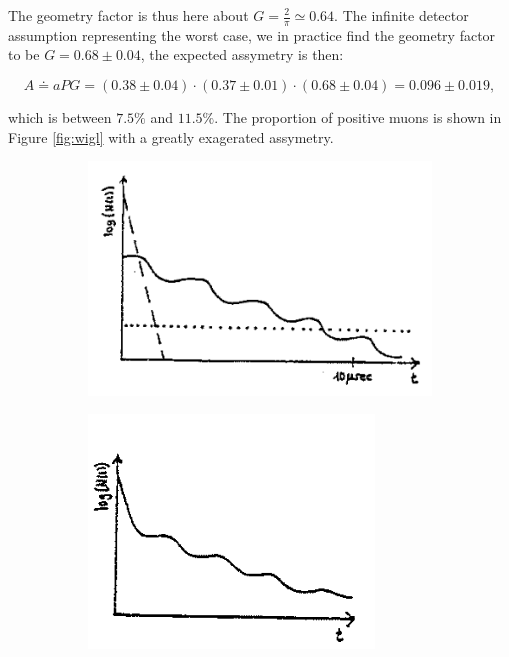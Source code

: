 \begin{enumerate}
The geometry factor is thus here about $G=\frac{2}{\pi}\simeq 0.64$. The infinite detector assumption representing the worst case, we in practice find the geometry factor to be $G=0.68\pm0.04$, the expected assymetry is then:

\begin{equation}
A \doteq aPG = (0.38 \pm 0.04) \cdot (0.37\pm 0.01) \cdot (0.68 \pm 0.04) = 0.096 \pm 0.019,
\end{equation}

which is between $7.5\%$ and $11.5\%$. The proportion of positive muons is shown in Figure \ref{fig:wigl} with a greatly exagerated assymetry.

\begin{figure}
\centering
   \begin{subfigure}[t]{0.49\linewidth}
  \centering
   \includegraphics[width=\linewidth]{./fig/wigl1.png}
  \caption{}
\label{sfig:wigl1}
  \end{subfigure}
   \begin{subfigure}[t]{0.49\linewidth}
  \centering
   \includegraphics[width=\linewidth]{./fig/wigl2.png}

\end{subfigure}
\end{figure}
\end{enumerate}
